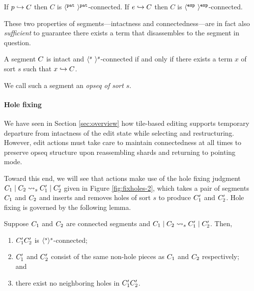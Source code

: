 \begin{lemma}
  If $p\hookrightarrow C$ then $C$ is $\langle^{\texttt{pat}}~\rangle^{\texttt{pat}}$-connected.
  If $e\hookrightarrow C$ then $C$ is $\langle^{\texttt{exp}}~\rangle^{\texttt{exp}}$-connected.
\end{lemma}




These two properties of segments---intactness
and connectedness---are in fact also \emph{sufficient} to
guarantee there exists a term that disassembles to
the segment in question.

\begin{theorem} \label{thm:term-parseability}
  A segment $C$ is intact and $\langle^{s}~\rangle^{s}$-connected
  if and only if there exists a term $x$ of sort $s$ such that
  $x\hookrightarrow C$.
\end{theorem}
\noindent
We call such a segment an \emph{opseq of sort $s$}.

\paragraph{Hole fixing}
We have seen in Section \ref{sec:overview} how tile-based
editing supports temporary departure from intactness of
the edit state while selecting and restructuring.
However, edit actions must take care to maintain
connectedness at all times to preserve opseq structure
upon reassembling shards and returning to pointing mode.



Toward this end, we will see that actions make use of the hole fixing judgment
$C_1\mid C_2\rightsquigarrow_{s}C'_1\mid C'_2$
given in Figure \ref{fig:fixholes-2},
which takes a pair of segments $C_1$ and $C_2$
and inserts and removes holes of sort $s$ to produce $C'_1$
and $C'_2$.
Hole fixing is governed by the following lemma.


\begin{lemma}
  Suppose $C_1$ and $C_2$ are connected segments
  and $C_1\mid C_2\rightsquigarrow_{s}C'_1\mid C'_2$.
  Then,
  \begin{enumerate}
    \item $C'_1C'_2$ is $\langle^{s}\rangle^{s}$-connected;
    \item $C'_1$ and $C'_2$ consist of the same non-hole pieces as
        $C_1$ and $C_2$ respectively; and
    \item there exist no neighboring holes in $C'_1C'_2$.
  \end{enumerate}
\end{lemma}


